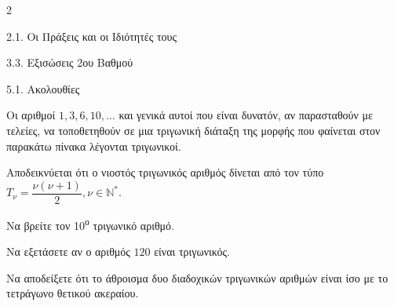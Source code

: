 \begin{ylh}{2}
    \item 2.1. Οι Πράξεις και οι Ιδιότητές τους
    \item 3.3. Εξισώσεις 2ου Βαθμού
    \item 5.1. Ακολουθίες
\end{ylh}

Οι αριθμοί $1, 3, 6, 10, \dots$ και γενικά αυτοί που είναι δυνατόν, αν παρασταθούν με τελείες, να τοποθετηθούν σε μια τριγωνική διάταξη της μορφής που φαίνεται στον παρακάτω πίνακα λέγονται τριγωνικοί.
\begin{center}
\end{center}
Αποδεικνύεται ότι ο νιοστός τριγωνικός αριθμός δίνεται από τον τύπο $T_\nu = \dfrac{\nu(\nu+1)}{2}, \nu \in \mathbb{N}^*$.

\begin{alist}
\item Να βρείτε τον 10\textsuperscript{ο} τριγωνικό αριθμό.
\item Να εξετάσετε αν ο αριθμός $120$ είναι τριγωνικός.
\item Να αποδείξετε ότι το άθροισμα δυο διαδοχικών τριγωνικών αριθμών είναι ίσο με το τετράγωνο θετικού ακεραίου.
\end{alist}

